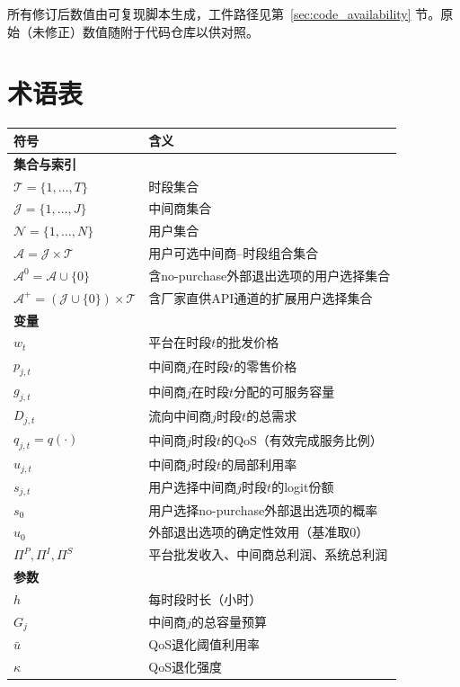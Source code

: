 \documentclass[UTF8,11pt]{ctexart}
\newcommand{\qos}{q}
\newcommand{\T}{\mathcal{T}}
\newcommand{\J}{\mathcal{J}}
\newcommand{\N}{\mathcal{N}}
\newcommand{\A}{\mathcal{A}}
\newcommand{\D}{D}
\begin{document}
所有修订后数值由可复现脚本生成，工件路径见第~\ref{sec:code_availability} 节。原始（未修正）数值随附于代码仓库以供对照。

\section*{术语表}
\label{sec:nomenclature}

\begin{longtable}{@{}p{}p{}@{}}
\toprule
符号 & 含义 \\
\midrule
\endhead
\multicolumn{2}{l}{\textbf{集合与索引}} \\
$\T=\{1,\ldots,T\}$ & 时段集合 \\
$\J=\{1,\ldots,J\}$ & 中间商集合 \\
$\N=\{1,\ldots,N\}$ & 用户集合 \\
$\A=\J\times\T$ & 用户可选中间商--时段组合集合 \\
$\A^0=\A\cup\{0\}$ & 含no-purchase外部退出选项的用户选择集合 \\
$\A^+=(\J\cup\{0\})\times\T$ & 含厂家直供API通道的扩展用户选择集合 \\
\midrule
\multicolumn{2}{l}{\textbf{变量}} \\
$w_t$ & 平台在时段$t$的批发价格 \\
$p_{j,t}$ & 中间商$j$在时段$t$的零售价格 \\
$g_{j,t}$ & 中间商$j$在时段$t$分配的可服务容量 \\
$\D_{j,t}$ & 流向中间商$j$时段$t$的总需求 \\
$q_{j,t}=\qos(\cdot)$ & 中间商$j$时段$t$的QoS（有效完成服务比例） \\
$u_{j,t}$ & 中间商$j$时段$t$的局部利用率 \\
$s_{j,t}$ & 用户选择中间商$j$时段$t$的logit份额 \\
$s_0$ & 用户选择no-purchase外部退出选项的概率 \\
$u_0$ & 外部退出选项的确定性效用（基准取0） \\
$\Pi^P,\Pi^I,\Pi^S$ & 平台批发收入、中间商总利润、系统总利润 \\
\midrule
\multicolumn{2}{l}{\textbf{参数}} \\
$h$ & 每时段时长（小时） \\
$G_j$ & 中间商$j$的总容量预算 \\
$\bar u$ & QoS退化阈值利用率 \\
$\kappa$ & QoS退化强度 \\

\end{longtable}
\end{document}

